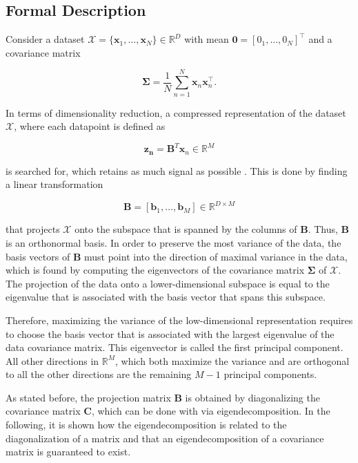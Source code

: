 \documentclass[../../../main.tex]{subfiles}
\begin{document}
\subsection{Formal Description}

Consider a dataset $\mathcal{X} = \{\bm{x}_1, \dots, \bm{x}_N\} \in \mathbb{R}^D$ with mean $\bm{0} = [0_1, \dots, 0_N]^\top$ and a covariance matrix

\begin{equation*}
    \bm{\Sigma} =\frac{1}{N}\sum_{n=1}^N\bm{x}_n\bm{x}_n^\top.
\end{equation*}

In terms of dimensionality reduction, a compressed representation of the dataset $\mathcal{X}$, where each datapoint is defined as

\begin{equation*}
    \bm{z_n} = \bm{B}^T\bm{x}_n \in \mathbb{R}^M
\end{equation*}

is searched for, which retains as much signal as possible \cite{Hotelling1933AnalysisOA}. This is done by finding a linear transformation

\begin{equation*}
    \bm{B}=[\bm{b}_1, \dots, \bm{b}_M] \in \mathbb{R}^{D\times M}
\end{equation*}

that projects $\mathcal{X}$ onto the subspace that is spanned by the columns of $\bm{B}$. Thus, $\bm{B}$ is an orthonormal basis. In order to preserve the most variance of the data, the basis vectors of $\bm{B}$ must point into the direction of maximal variance in the data, which is found by computing the eigenvectors of the covariance matrix $\bm{\Sigma}$ of $\mathcal{X}$. The projection of the data onto a lower-dimensional subspace is equal to the eigenvalue that is associated with the basis vector that spans this subspace. 

Therefore, maximizing the variance of the low-dimensional representation requires to choose the basis vector that is associated with the largest eigenvalue of the data covariance matrix. This eigenvector is called the first principal component. All other directions in $\mathbb{R}^M$, which both maximize the variance and are orthogonal to all the other directions are the remaining $M-1$ principal components.

As stated before, the projection matrix $\bm{B}$ is obtained by diagonalizing the covariance matrix $\bm{C}$, which can be done with via eigendecomposition. In the following, it is shown how the eigendecomposition is related to the diagonalization of a matrix and that an eigendecomposition of a covariance matrix is guaranteed to exist.
\end{document}
